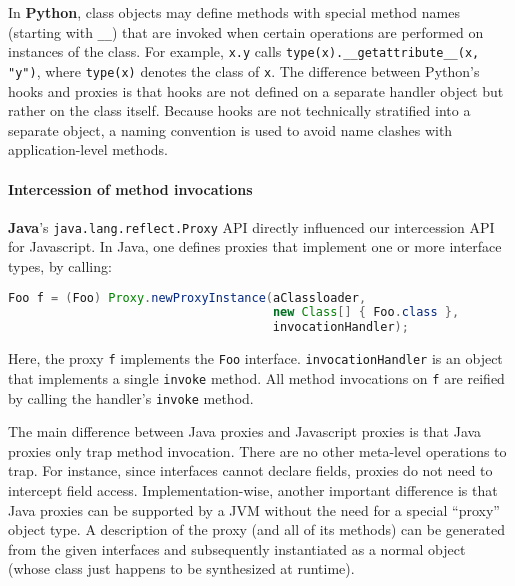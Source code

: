 \documentclass{acm_proc_article-sp}
\begin{document}
In \textbf{Python}, class objects may define methods with special method names (starting with \texttt{__}) that are invoked when certain operations are performed on instances of the class. For example, \texttt{x.y} calls \texttt{type(x).__getattribute__(x, "y")}, where \texttt{type(x)} denotes the class of \texttt{x}. The difference between Python's hooks and proxies is that hooks are not defined on a separate handler object but rather on the class itself. Because hooks are not technically stratified into a separate object, a naming convention is used to avoid name clashes with application-level methods.

\paragraph{Intercession of method invocations}

\textbf{Java}'s \texttt{java.lang.reflect.Proxy} API directly influenced our intercession API for Javascript. In Java, one defines proxies that implement one or more interface types, by calling:

\begin{lstlisting}[language=java]
Foo f = (Foo) Proxy.newProxyInstance(aClassloader,
                                     new Class[] { Foo.class },
                                     invocationHandler);
\end{lstlisting}

Here, the proxy \texttt{f} implements the \texttt{Foo} interface. \texttt{invocationHandler} is an object that implements a single \texttt{invoke} method. All method invocations on \texttt{f} are reified by calling the handler's \texttt{invoke} method.

The main difference between Java proxies and Javascript proxies is that Java proxies only trap method invocation. There are no other meta-level operations to trap. For instance, since interfaces cannot declare fields, proxies do not need to intercept field access. Implementation-wise, another important difference is that Java proxies can be supported by a JVM without the need for a special ``proxy'' object type. A description of the proxy (and all of its methods) can be generated from the given interfaces and subsequently instantiated as a normal object (whose class just happens to be synthesized at runtime).


\end{document}
